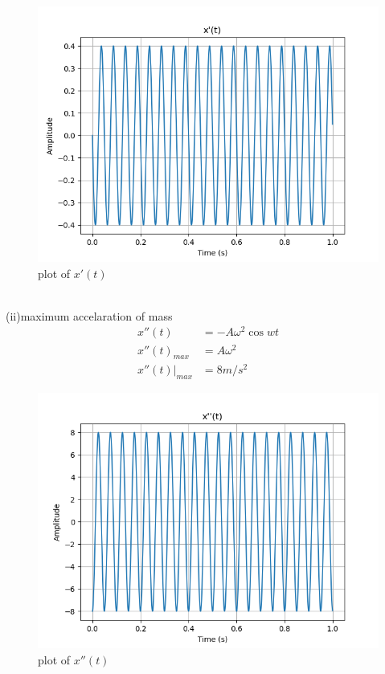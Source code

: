 \documentclass[journal,12pt,twocolumn]{IEEEtran}
\theoremstyle{remark}
\begin{document}
\begin{figure}[h!]
    \centering
    \includegraphics[width=1.1\linewidth]{figs/analog2.png}
    \caption{plot of $x'(t)$}
\end{figure}\\
(ii)maximum accelaration of mass\\
\begin{align}
   x''(t)&=-A\omega^2 \cos{wt}\\
    x''(t)_{max}&=A\omega^2\\
    x''(t)\Bigr|_{max}&=8m/s^2
\end{align}
\begin{figure}[h!]
    \centering
    \includegraphics[width=1.1\linewidth]{figs/analog3.png}
    \caption{plot of $x''(t)$}
\end{figure}
\end{document}

